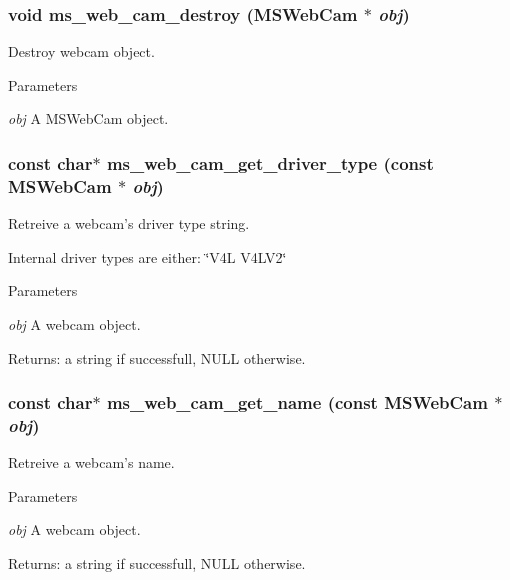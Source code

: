 \subsubsection[{ms\_\-web\_\-cam\_\-destroy}]{\setlength{\rightskip}{0pt plus 5cm}void ms\_\-web\_\-cam\_\-destroy ({\bf MSWebCam} $\ast$ {\em obj})}\label{group__mediastreamer2__webcam_gae0c162bbc2b3d8d94652610a2657f925}
Destroy webcam object.


\begin{DoxyParams}{Parameters}
\item[{\em obj}]A MSWebCam object. \end{DoxyParams}
\subsubsection[{ms\_\-web\_\-cam\_\-get\_\-driver\_\-type}]{\setlength{\rightskip}{0pt plus 5cm}const char$\ast$ ms\_\-web\_\-cam\_\-get\_\-driver\_\-type (const {\bf MSWebCam} $\ast$ {\em obj})}\label{group__mediastreamer2__webcam_ga391a7f96ec2827ddfece5e85aa9b84cc}
Retreive a webcam's driver type string.

Internal driver types are either: \char`\"{}V4L V4LV2\char`\"{}


\begin{DoxyParams}{Parameters}
\item[{\em obj}]A webcam object.\end{DoxyParams}
Returns: a string if successfull, NULL otherwise. 
\subsubsection[{ms\_\-web\_\-cam\_\-get\_\-name}]{\setlength{\rightskip}{0pt plus 5cm}const char$\ast$ ms\_\-web\_\-cam\_\-get\_\-name (const {\bf MSWebCam} $\ast$ {\em obj})}\label{group__mediastreamer2__webcam_ga7651c3a20498ff4bf2500c88ba23cc05}
Retreive a webcam's name.


\begin{DoxyParams}{Parameters}
\item[{\em obj}]A webcam object.\end{DoxyParams}
Returns: a string if successfull, NULL otherwise. 
